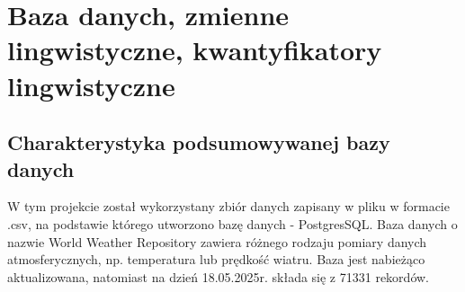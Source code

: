 \documentclass{article}
\begin{document}
\section{Baza danych, zmienne lingwistyczne, kwantyfikatory lingwistyczne}

\subsection{Charakterystyka podsumowywanej bazy danych}
W tym projekcie został wykorzystany zbiór danych zapisany w pliku w formacie .csv, na podstawie którego utworzono bazę danych - PostgresSQL. Baza danych o nazwie World Weather Repository zawiera różnego rodzaju pomiary danych atmosferycznych, np. temperatura lub prędkość wiatru. \cite{baza} Baza jest nabieżąco aktualizowana, natomiast na dzień 18.05.2025r. składa się z 71331 rekordów. 
\end{document}

